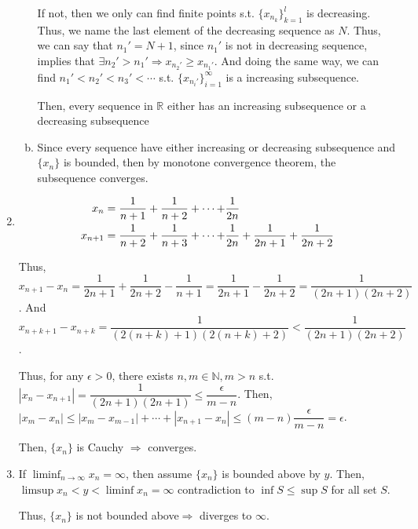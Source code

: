 \documentclass[12pt]{article}
\begin{document}
\begin{enumerate}
\begin{enumerate}[(a)]
        If not, then we only can find finite points s.t. $\lbrace x_{n_k}\rbrace_{k=1}^l$ is decreasing. Thus, we name the last element of the decreasing sequence as $N$.
        Thus, we can say that $n_1' = N + 1$, since $n_1'$ is not in decreasing sequence, implies that $\exists n_2' > n_1' \Rightarrow x_{n_2'} \geq x_{n_1'}$.
        And doing the same way,  we can find $n_1' < n_2' < n_3' < \cdots$ s.t. $\lbrace x_{n_i'}\rbrace_{i=1}^\infty$ is a increasing subsequence.

        Then, every sequence in $\mathbb{R}$ either has an increasing subsequence or a decreasing subsequence

        \item Since every sequence have either increasing or decreasing subsequence and $\lbrace x_n \rbrace$ is bounded,
        then by monotone convergence theorem, the subsequence converges.
    \end{enumerate} 
    
    \newpage
    \item \begin{align*}
        x_n = \dfrac{1}{n+1} + \dfrac{1}{n+2} + \cdots + &\dfrac{1}{2n}
        \notag
        \\x_{n+1} = \dfrac{1}{n+2} + \dfrac{1}{n+3} + \cdots + &\dfrac{1}{2n} + \dfrac{1}{2n+1} + \dfrac{1}{2n+2}
    \end{align*}

    Thus, $x_{n+1} - x_n = \dfrac{1}{2n+1} + \dfrac{1}{2n+2} - \dfrac{1}{n+1} = \dfrac{1}{2n+1} - \dfrac{1}{2n+2} = \dfrac{1}{(2n+1)(2n+2)}$.
    And $x_{n+k+1} - x_{n+k} = \dfrac{1}{(2(n+k)+1)(2(n+k)+2)} < \dfrac{1}{(2n+1)(2n+2)}$.

    Thus, for any $\epsilon > 0$, there exists $n, m \in \mathbb{N}, m>n$ s.t. $|x_{n} - x_{n+1}| = \dfrac{1}{(2n+1)(2n+1)} \leq \dfrac{\epsilon}{m-n}$.
    Then, $|x_{m} - x_n| \leq |x_m - x_{m-1}| + \cdots + |x_{n+1} - x_n| \leq (m-n) \dfrac{\epsilon}{m-n} = \epsilon$.

    Then, $\lbrace x_n\rbrace$ is Cauchy $\Rightarrow$ converges. 

    \item If $\displaystyle\liminf_{n \to \infty} x_n = \infty$, then assume $\lbrace x_n\rbrace$ is bounded above by $y$.
    Then, $\limsup x_n < y < \liminf x_n = \infty$ contradiction to $\inf S \leq \sup S$ for all set $S$.

    Thus, $\lbrace x_n \rbrace$ is not bounded above$\Rightarrow$ diverges to $\infty$.
\end{enumerate}
\end{document}
